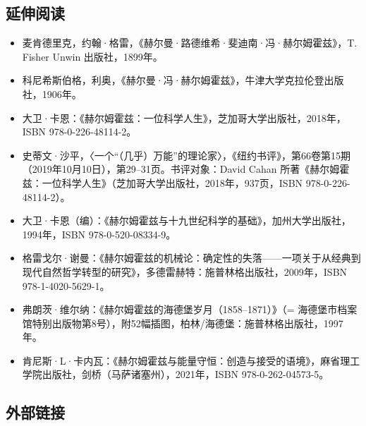 \subsection{延伸阅读}
\begin{itemize}
\item 麦肯德里克，约翰·格雷，《赫尔曼·路德维希·斐迪南·冯·赫尔姆霍兹》，T. Fisher Unwin 出版社，1899年。
\item 科尼希斯伯格，利奥，《赫尔曼·冯·赫尔姆霍兹》，牛津大学克拉伦登出版社，1906年。
\item 大卫·卡恩：《赫尔姆霍兹：一位科学人生》，芝加哥大学出版社，2018年，ISBN 978-0-226-48114-2。
\item 史蒂文·沙平，〈一个“（几乎）万能”的理论家〉，《纽约书评》，第66卷第15期（2019年10月10日），第29–31页。书评对象：David Cahan 所著《赫尔姆霍兹：一位科学人生》（芝加哥大学出版社，2018年，937页，ISBN 978-0-226-48114-2）。
\item 大卫·卡恩（编）：《赫尔姆霍兹与十九世纪科学的基础》，加州大学出版社，1994年，ISBN 978-0-520-08334-9。
\item 格雷戈尔·谢曼：《赫尔姆霍兹的机械论：确定性的失落——一项关于从经典到现代自然哲学转型的研究》，多德雷赫特：施普林格出版社，2009年，ISBN 978-1-4020-5629-1。
\item 弗朗茨·维尔纳：《赫尔姆霍兹的海德堡岁月（1858–1871）》（= 海德堡市档案馆特别出版物第8号），附52幅插图，柏林/海德堡：施普林格出版社，1997年。
\item 肯尼斯·L·卡内瓦：《赫尔姆霍兹与能量守恒：创造与接受的语境》，麻省理工学院出版社，剑桥（马萨诸塞州），2021年，ISBN 978-0-262-04573-5。
\end{itemize}
\subsection{外部链接}
